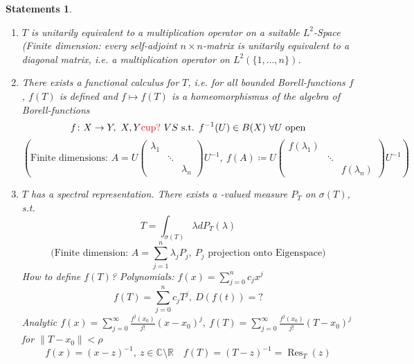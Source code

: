 \documentclass[12pt]{extreport} %
\newcommand{\C}{\mathbb{C}}
\newcommand{\R}{\mathbb{R}}
\theoremstyle{named}
\theoremstyle{nnamed}
\theoremstyle{itshape}
\theoremstyle{normal}
\newtheorem*{statements}{Statements}
\begin{document}
\begin{statements} ~\
		\begin{enumerate}[label=\arabic*\upshape)]
			\item $T$ is unitarily equivalent to a multiplication operator on a suitable $L^2$-Space (Finite dimension: every self-adjoint $n \times n$-matrix is unitarily equivalent to a diagonal matrix, i.e. a multiplication operator on $L^2\left( \{1, \dotsc, n\} \right)$.
			\item There exists a functional calculus for $T$, i.e. for all bounded Borell-functions $f$, $f(T)$ is defined and $f \mapsto f(T)$ is a homeomorphismus of the algebra of Borell-functions
				$$ f \colon X \rightarrow Y, ~ X, Y \text{\color{red} cup?}~ VS \text{ s.t. } f^{-1}(U) \in B(X) ~\forall U \text{ open} $$ %
				$$ \left( \text{Finite dimensions: } A = U \begin{pmatrix} \lambda_1 & ~ & ~ \\ ~ & \ddots & ~ \\ ~ & ~ & \lambda_n \end{pmatrix} U^{-1}, ~ f(A) \coloneqq U \begin{pmatrix} f(\lambda_1) & ~ & ~ \\ ~ & \ddots & ~ \\ ~ & ~ & f(\lambda_n) \end{pmatrix} U^{-1} \right) $$
			\item $T$ has a spectral representation. There exists a \text{\color{red} projection?}-valued measure $P_T$ on $\sigma(T)$, s.t. %
				$$ T = \int_{\sigma(T)} \lambda dP_T(\lambda) $$
				$$ \text{(Finite dimension: } A = \sum_{j=1}^n \lambda_j P_j, ~ P_j \text{ projection onto Eigenspace)} $$
				How to define $f(T)$? Polynomials: $f(x) = \sum_{j=0}^n c_j x^j$
					$$ f(T) = \sum_{j=0}^n c_j T^j, ~ D(f(t)) = ? $$
				Analytic $f(x) = \sum_{j=0}^\infty \frac{f^j(x_0)}{j!} (x - x_0)^j, ~ f(T) = \sum_{j=0}^\infty \frac{f^j(x_0)}{j!} (T - x_0)^j$ for $\| T - x_0 \| < \rho$
				$$ f(x) = (x - z)^{-1}, ~z \in \C \setminus \R \quad f(T) = (T - z)^{-1} = \operatorname{Res}_T(z) $$
		\end{enumerate}	
\end{statements}
\end{document}
